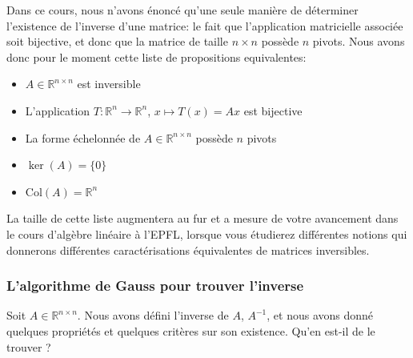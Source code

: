 \documentclass{article}
\newcommand{\R}{\mathbb{R}}
\newcommand{\cross}{\times}
\newcommand{\Col}{\text{Col}}
\begin{document}
\noindent Dans ce cours, nous n'avons énoncé qu'une seule manière de déterminer l'existence de l'inverse d'une matrice: le fait que l'application matricielle associée soit bijective, et donc que la matrice de taille $n \cross n$ possède $n$ pivots. Nous avons donc pour le moment cette liste de propositions equivalentes:
\begin{itemize}
    \item $A \in \R^{n \cross n}$ est inversible
    \item L'application $T: \R^n \to \R^n$, $x \mapsto T(x)=Ax$ est bijective
    \item La forme échelonnée de $A \in \R^{n \cross n}$ possède $n$ pivots
    \item $\ker (A) = \{0\}$
    \item $\Col (A) = \R^n$
\end{itemize}
La taille de cette liste augmentera au fur et a mesure de votre avancement dans le cours d'algèbre linéaire à l'EPFL, lorsque vous étudierez différentes notions qui donnerons différentes caractérisations équivalentes de matrices inversibles. 

\subsubsection{L'algorithme de Gauss pour trouver l'inverse}
\noindent Soit $A \in \R^{n\cross n}$. Nous avons défini l'inverse de $A$, $A^{-1}$, et nous avons donné quelques propriétés et quelques critères sur son existence. Qu'en est-il de le trouver ? \\
\end{document}
